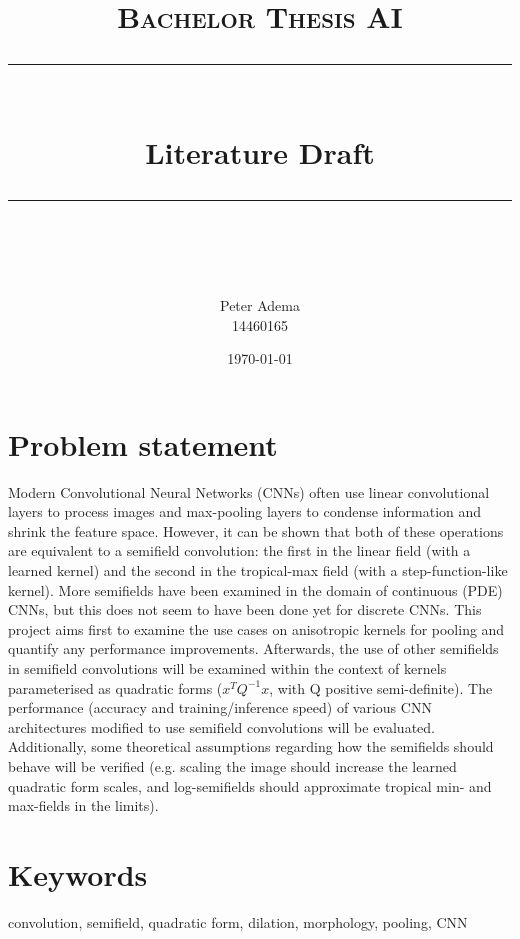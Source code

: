 \documentclass[11pt]{article} %
\title{	
    \vspace*{-1.5cm}
	\normalfont\normalsize
	\textsc{Bachelor Thesis AI}\\ %
	\vspace{3pt}
	\rule{\linewidth}{0.5pt}\\
	\vspace{14pt}
	{\huge Literature Draft}\\ %
	\vspace{4pt}
	\rule{\linewidth}{2pt}\\
	\vspace{4pt}
}
\author{
    \Large Peter Adema \\ 14460165
}
\date{\normalsize\today}  %
\begin{document}
\maketitle %

\section{Problem statement}
Modern Convolutional Neural Networks (CNNs) often use linear convolutional layers to process images and max-pooling layers to condense information and shrink the feature space. However, it can be shown that both of these operations are equivalent to a semifield convolution: the first in the linear field (with a learned kernel) and the second in the tropical-max field (with a step-function-like kernel). More semifields have been examined in the domain of continuous (PDE) CNNs, but this does not seem to have been done yet for discrete CNNs. This project aims first to examine the use cases on anisotropic kernels for pooling and quantify any performance improvements. Afterwards, the use of other semifields in semifield convolutions will be examined within the context of kernels parameterised as quadratic forms ($x^TQ^{-1}x$, with Q positive semi-definite). The performance (accuracy and training/inference speed) of various CNN architectures modified to use semifield convolutions will be evaluated. Additionally, some theoretical assumptions regarding how the semifields should behave will be verified (e.g. scaling the image should increase the learned quadratic form scales, and log-semifields should approximate tropical min- and max-fields in the limits). 
\section{Keywords}
convolution, semifield, quadratic form, dilation, morphology, pooling, CNN

\newpage
\end{document}
